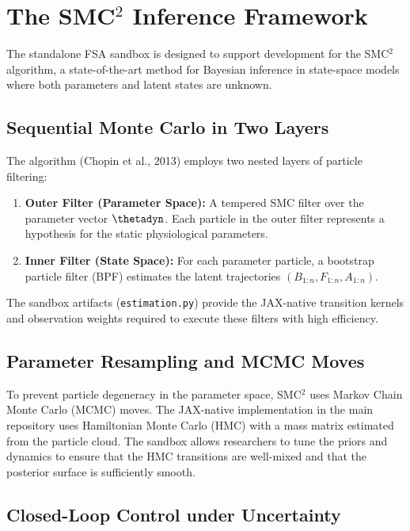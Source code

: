 \section{The SMC${}^2$ Inference Framework}

The standalone FSA sandbox is designed to support development for the SMC${}^2$ algorithm, a state-of-the-art method for Bayesian inference in state-space models where both parameters and latent states are unknown.

\subsection{Sequential Monte Carlo in Two Layers}

The algorithm (Chopin et al., 2013) employs two nested layers of particle filtering:
\begin{enumerate}
    \item \textbf{Outer Filter (Parameter Space):} A tempered SMC filter over the parameter vector $\thetadyn$. Each particle in the outer filter represents a hypothesis for the static physiological parameters.
    \item \textbf{Inner Filter (State Space):} For each parameter particle, a bootstrap particle filter (BPF) estimates the latent trajectories $(B_{1:n}, F_{1:n}, A_{1:n})$.
\end{enumerate}

The sandbox artifacts (\texttt{estimation.py}) provide the JAX-native transition kernels and observation weights required to execute these filters with high efficiency.

\subsection{Parameter Resampling and MCMC Moves}

To prevent particle degeneracy in the parameter space, SMC${}^2$ uses Markov Chain Monte Carlo (MCMC) moves. The JAX-native implementation in the main repository uses Hamiltonian Monte Carlo (HMC) with a mass matrix estimated from the particle cloud. The sandbox allows researchers to tune the priors and dynamics to ensure that the HMC transitions are well-mixed and that the posterior surface is sufficiently smooth.

\subsection{Closed-Loop Control under Uncertainty}


